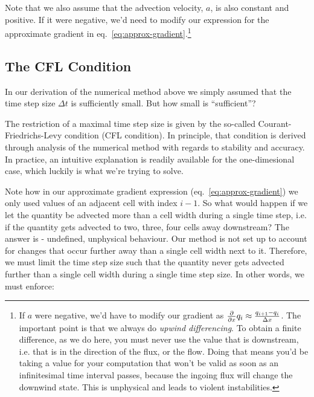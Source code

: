 Note that we also assume that the advection velocity, $a$, is also constant and positive.
If it were negative, we'd need to modify our expression for the approximate gradient in 
eq.~\ref{eq:approx-gradient}.\footnote{
	If $a$ were negative, we'd have to modify our gradient as $\frac{\partial}{\partial x}{q_i} \approx \frac{q_{i+1} - q_i}{\Delta x}$.
	The important point is that we always do \emph{upwind differencing}. To obtain a 
	finite difference, as we do here, you must never use the value that is downstream, 
	i.e. that is in the direction of the flux, or the flow. Doing that means you'd be 
	taking a value for your computation that won't be valid as soon as an infinitesimal 
	time interval passes, because the ingoing flux will change the downwind state.
	This is unphysical and leads to violent instabilities.
}









\subsection{The CFL Condition}

In our derivation of the numerical method above we simply assumed that the time
step size $\Delta t$ is sufficiently small. But how small is ``sufficient''?

The restriction of a maximal time step size is given by the so-called 
Courant-Friedrichs-Levy condition (CFL condition). In principle, that condition
is derived through analysis of the numerical method with regards to stability and
accuracy. In practice, an intuitive explanation is readily available for the one-dimesional
case, which luckily is what we're trying to solve.

Note how in our approximate gradient expression (eq.~\ref{eq:approx-gradient})
we only used values of an adjacent cell with index $i - 1$. So what would happen if
we let the quantity be advected more than a cell width during a single time step, i.e.
if the quantity gets advected to two, three, four cells away downstream? The answer is -
undefined, unphysical behaviour. Our method is not set up to account for changes that
occur further away than a single cell width next to it. Therefore, we must limit the
time step size such that the quantity never gets advected further than a single cell width
during a single time step size. In other words, we must enforce:

